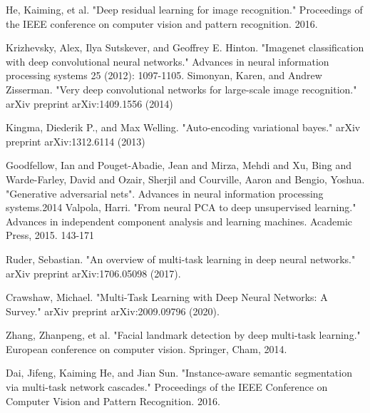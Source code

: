 \documentclass[journal]{IEEEtran}
\begin{document}
%
%
%
\begin{thebibliography}{1}
He, Kaiming, et al. "Deep residual learning for image recognition." Proceedings of the IEEE conference on computer vision and pattern recognition. 2016.

Krizhevsky, Alex, Ilya Sutskever, and Geoffrey E. Hinton. "Imagenet classification with deep convolutional neural networks." Advances in neural information processing systems 25 (2012): 1097-1105.
Simonyan, Karen, and Andrew Zisserman. "Very deep convolutional networks for large-scale image recognition." arXiv preprint arXiv:1409.1556 (2014)

Kingma, Diederik P., and Max Welling. "Auto-encoding variational bayes." arXiv preprint arXiv:1312.6114 (2013)

Goodfellow, Ian and Pouget-Abadie, Jean and Mirza, Mehdi and Xu, Bing and Warde-Farley, David and Ozair, Sherjil and Courville, Aaron and Bengio, Yoshua. "Generative adversarial nets". Advances in neural information processing systems.2014
Valpola, Harri. "From neural PCA to deep unsupervised learning." Advances in independent component analysis and learning machines. Academic Press, 2015. 143-171

Ruder, Sebastian. "An overview of multi-task learning in deep neural networks." arXiv preprint arXiv:1706.05098 (2017).

Crawshaw, Michael. "Multi-Task Learning with Deep Neural Networks: A Survey." arXiv preprint arXiv:2009.09796 (2020).

Zhang, Zhanpeng, et al. "Facial landmark detection by deep multi-task learning." European conference on computer vision. Springer, Cham, 2014.

Dai, Jifeng, Kaiming He, and Jian Sun. "Instance-aware semantic segmentation via multi-task network cascades." Proceedings of the IEEE Conference on Computer Vision and Pattern Recognition. 2016.


\end{thebibliography}
\end{document}
